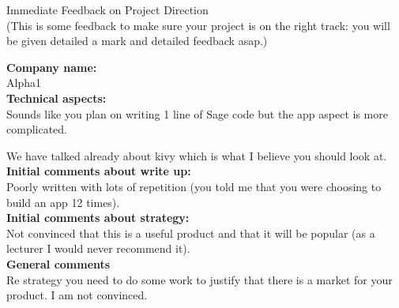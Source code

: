 \documentclass{article}
\begin{document}
\begin{center}
\Huge{Immediate Feedback on Project Direction}\\
\tiny{(This is some feedback to make sure your project is on the right track: you will be given detailed a mark and detailed feedback asap.)}
\end{center}


\normalsize
\textbf{Company name:}\\

Alpha1 \\

\textbf{Technical aspects:}\\

Sounds like you plan on writing 1 line of Sage code but the app aspect is more complicated.

We have talked already about kivy which is what I believe you should look at.\\

\textbf{Initial comments about write up:}\\

Poorly written with lots of repetition (you told me that you were choosing to build an app 12 times).\\

\textbf{Initial comments about strategy:}\\

Not convinced that this is a useful product and that it will be popular (as a lecturer I would never recommend it).\\

\textbf{General comments}\\

Re strategy you need to do some work to justify that there is a market for your product. I am not convinced.
\end{document}
